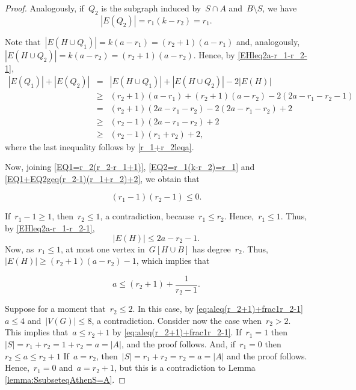 \documentclass[11pt]{article}
\theoremstyle{definition}
\begin{document}
\begin{proof}
Analogously, if~$Q_2$ is the subgraph induced by~$S\cap A$ and~$B \setminus S$, we have
\begin{equation}\label{EQ2=r_1(k-r_2)=r_1}
|E(Q_2)|=r_1(k-r_2)=r_1.
\end{equation}

Note that~$|E(H \cup Q_1)|=k(a-r_1) = (r_2+1)(a-r_1)$
and, analogously,~$|E(H \cup Q_2)|=k(a-r_2) = (r_2+1)(a-r_2)$.
Hence, by \eqref{EHleq2a-r_1-r_2-1},
\begin{eqnarray}    
|E(Q_1)|+ |E(Q_2)| &=& |E(H \cup Q_1)|+|E(H \cup Q_2)|-2|E(H)| \nonumber \\
&\geq& (r_2+1)(a-r_1) + (r_2+1)(a-r_2) -2(2a-r_1-r_2-1) \nonumber \\
&=& (r_2+1)(2a-r_1-r_2)-2(2a-r_1-r_2)+2 \nonumber \\
&\geq& (r_2-1)(2a-r_1-r_2)+2  \nonumber \\
&\geq& (r_2-1)(r_1+r_2)+2, \label{EQ1+EQ2geq(r_2-1)(r_1+r_2)+2}
\end{eqnarray}
where the last inequality follows by \eqref{r_1+r_2leqa}.

Now, joining \eqref{EQ1=r_2(r_2-r_1+1)}, \eqref{EQ2=r_1(k-r_2)=r_1} and \eqref{EQ1+EQ2geq(r_2-1)(r_1+r_2)+2}, we obtain that 

\begin{equation}
    (r_1-1)(r_2-1) \leq 0.
\end{equation}



If~$r_1-1 \geq 1$, then~$r_2\leq 1$, a contradiction, because~$r_1 \leq r_2$. Hence,~$r_1\leq 1$.
Thus, by \eqref{EHleq2a-r_1-r_2-1},
$$|E(H)| \leq 2a-r_2-1.$$
Now, as~$r_1 \leq 1$, at most one vertex in~$G[H \cup B]$ has degree~$r_2$.
Thus,~$|E(H)| \geq (r_2+1)(a-r_2)-1$, which implies that

\begin{equation}\label{eq:aleq(r_2+1)+frac1r_2-1}
a \leq (r_2+1) + \frac{1}{r_2-1}.    
\end{equation}


Suppose for a moment that~$r_2 \leq 2$.
In this case, by \eqref{eq:aleq(r_2+1)+frac1r_2-1}
$a\leq 4$ and~$|V(G)| \leq 8$, a contradiction.
Consider now the case when~$r_2 > 2$. 
This implies that~$a\leq r_2+1$ by \eqref{eq:aleq(r_2+1)+frac1r_2-1}.
If~$r_1=1$
then~$|S|=r_1+r_2=1+r_2=a=|A|$, and the proof follows.
And, if~$r_1=0$ then~$r_2 \leq a \leq r_2+1$
If~$a=r_2$, then~$|S|=r_1+r_2=r_2=a=|A|$
and the proof follows.
Hence,~$r_1=0$ and~$a=r_2+1$,
but this is a contradiction to Lemma \ref{lemma:SsubseteqAthenS=A}.
\end{proof}
\end{document}
